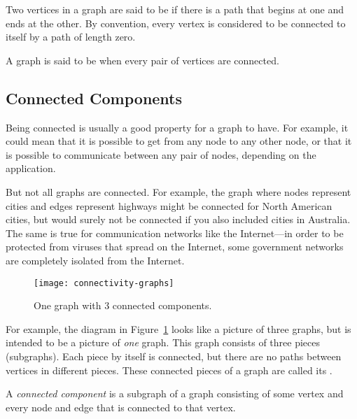 \begin{definition}
  Two vertices in a graph are said to be  if there
  is a path that begins at one and ends at the other.  By convention,
  every vertex is considered to be connected to itself by a path of
  length zero.
\end{definition}

\begin{definition}\label{def:connected-graph}
A graph is said to be  when every pair of vertices are
connected.
\end{definition}

\subsection{Connected Components}

Being connected is usually a good property for a graph to have.  For
example, it could mean that it is possible to get from any node to any
other node, or that it is possible to communicate between any pair of
nodes, depending on the application.

But not all graphs are connected.  For example, the graph where nodes
represent cities and edges represent highways might be connected for
North American cities, but would surely not be connected if you also
included cities in Australia.  The same is true for communication
networks like the Internet---in order to be protected from viruses
that spread on the Internet, some government networks are completely
isolated from the Internet.

\begin{figure}[htbp]\redrawn

\texttt{[image: connectivity-graphs]}

\caption{One graph with 3 connected components.}

\label{fig:3comp}
\end{figure}

For example, the diagram in Figure~\ref{fig:3comp} looks like a
picture of three graphs, but is intended to be a picture of \emph{one}
graph.  This graph consists of three pieces (subgraphs).  Each piece
by itself is connected, but there are no paths between vertices in
different pieces.  These connected pieces of a graph are called its
.

\begin{definition}\label{def:connected-component}
A \emph{connected component} is a subgraph of a graph consisting of
some vertex and every node and edge that is connected to that vertex.
\end{definition}

